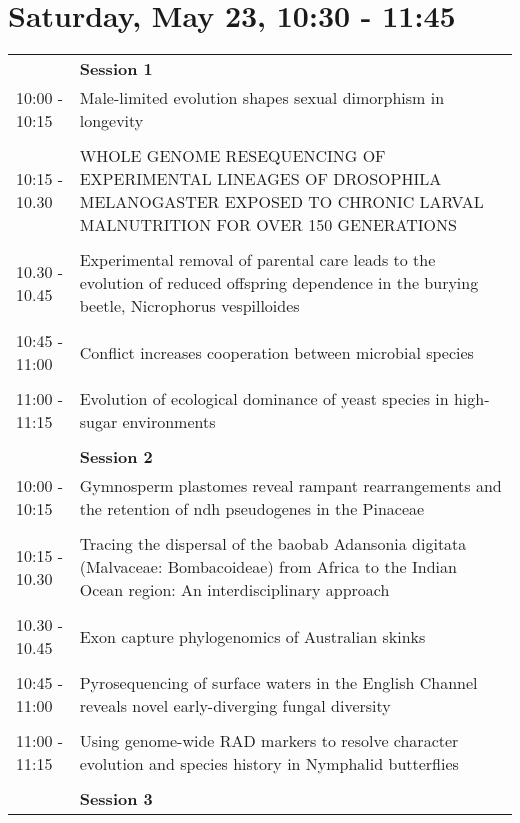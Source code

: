 \documentclass{article}
\begin{document}
\section{Saturday, May 23, 10:30 - 11:45}
\begin{longtabu} to \textwidth {lX}
 & \textbf{Session 1} \\ 

10:00 - 10:15 & Male-limited evolution shapes sexual dimorphism in longevity \\ 
 &  \\ 
10:15 - 10.30 & WHOLE GENOME RESEQUENCING OF EXPERIMENTAL LINEAGES OF DROSOPHILA MELANOGASTER EXPOSED TO CHRONIC LARVAL MALNUTRITION FOR OVER 150 GENERATIONS \\ 
 &  \\ 
10.30 - 10.45 & Experimental removal of parental care leads to the evolution of reduced offspring dependence in the burying beetle, Nicrophorus vespilloides \\ 
 &  \\ 
10:45 - 11:00 & Conflict increases cooperation between microbial species \\ 
 &  \\ 
11:00 - 11:15 & Evolution of ecological dominance of yeast species in high-sugar environments \\ 
 &  \\ 
 & \textbf{Session 2} \\ 

10:00 - 10:15 & Gymnosperm plastomes reveal rampant rearrangements and the retention of ndh pseudogenes in the Pinaceae \\ 
 &  \\ 
10:15 - 10.30 & Tracing the dispersal of the baobab Adansonia digitata (Malvaceae: Bombacoideae) from Africa to the Indian Ocean region: An interdisciplinary approach \\ 
 &  \\ 
10.30 - 10.45 & Exon capture phylogenomics of Australian skinks \\ 
 &  \\ 
10:45 - 11:00 & Pyrosequencing of surface waters in the English Channel reveals novel early-diverging fungal diversity \\ 
 &  \\ 
11:00 - 11:15 & Using genome-wide RAD markers to resolve character evolution and species history in Nymphalid butterflies \\ 
 &  \\ 
 & \textbf{Session 3} \\ 


\end{longtabu}
\end{document}
